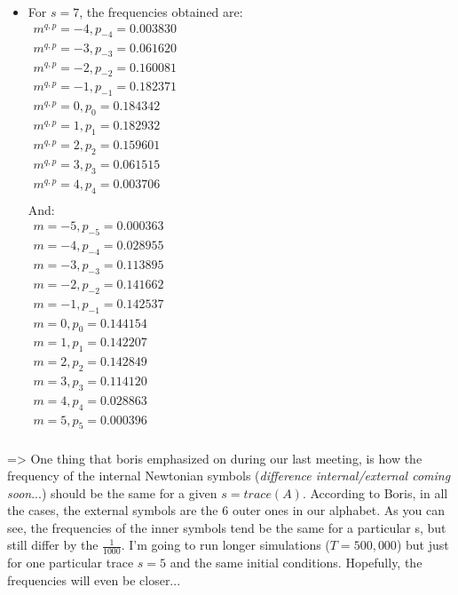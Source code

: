 \begin{enumerate}
\begin{itemize}
\item
For $s = 7$, the frequencies obtained are:\\
$
\begin{array}{l}
m^{q,p} = -4, p_{-4} = 0.003830 \\
m^{q,p} = -3, p_{-3} = 0.061620 \\
m^{q,p} = -2, p_{-2} = 0.160081 \\
m^{q,p} = -1, p_{-1} = 0.182371 \\
m^{q,p} = 0, p_{0} = 0.184342 \\
m^{q,p} = 1, p_{1} = 0.182932 \\
m^{q,p} = 2, p_{2} = 0.159601 \\
m^{q,p} = 3, p_{3} = 0.061515 \\
m^{q,p} = 4, p_{4} = 0.003706 \\
\end{array}
$
\\And: \\
$
\begin{array}{l}
m = -5, p_{-5} = 0.000363 \\
m = -4, p_{-4} = 0.028955 \\
m = -3, p_{-3} = 0.113895 \\
m = -2, p_{-2} = 0.141662 \\
m = -1, p_{-1} = 0.142537 \\
m = 0, p_{0} = 0.144154 \\
m = 1, p_{1} = 0.142207 \\
m = 2, p_{2} = 0.142849 \\
m = 3, p_{3} = 0.114120 \\
m = 4, p_{4} = 0.028863 \\
m = 5, p_{5} = 0.000396 \\
\end{array}
$
\\


\end{itemize}

=> One thing that boris emphasized on during our last meeting, is how the frequency of the internal Newtonian symbols (\textit{difference internal/external coming soon}...) should be the same for a given $s = trace(A)$. According to Boris, in all the cases, the external symbols are the 6 outer ones in our alphabet. As you can see, the frequencies of the inner symbols tend be the same for a particular s, but still differ by the $\frac{1}{1000}$. I'm going to run longer simulations ($T = 500,000$) but just for one particular trace $s=5$ and the same initial conditions. Hopefully, the frequencies will even be closer...


\end{enumerate}
